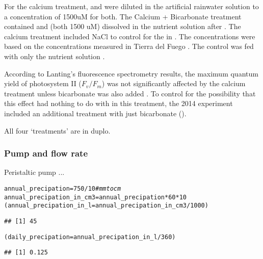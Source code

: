 \documentclass[12pt,a4paper,draft]{article}\usepackage[]{graphicx}\usepackage[]{color}
\makeatletter
\newcommand{\hlnum}[1]{\textcolor[rgb]{0.686,0.059,0.569}{#1}}%
\newcommand{\hlcom}[1]{\textcolor[rgb]{0.678,0.584,0.686}{\textit{#1}}}%
\newcommand{\hlopt}[1]{\textcolor[rgb]{0,0,0}{#1}}%
\newcommand{\hlstd}[1]{\textcolor[rgb]{0.345,0.345,0.345}{#1}}%
\newcommand{\hlkwb}[1]{\textcolor[rgb]{0.69,0.353,0.396}{#1}}%
\newenvironment{kframe}{%
 \def\at@end@of@kframe{}%
 \ifinner\ifhmode%
  \def\at@end@of@kframe{\end{minipage}}%
  \begin{minipage}{\columnwidth}%
 \fi\fi%
 \def\FrameCommand##1{\hskip\@totalleftmargin \hskip-\fboxsep
 \colorbox{shadecolor}{##1}\hskip-\fboxsep
     \hskip-\linewidth \hskip-\@totalleftmargin \hskip\columnwidth}%
 \MakeFramed {\advance\hsize-\width
   \@totalleftmargin\z@ \linewidth\hsize
   \@setminipage}}%
 {\par\unskip\endMakeFramed%
 \at@end@of@kframe}
\newenvironment{knitrout}{}{} %
\makeatother
\begin{document}
For the calcium treatment,  and  were diluted in the artificial rainwater solution \citep[app.~2]{smolders2001, lanting2010} to a concentration of 1500uM for both. The Calcium + Bicarbonate treatment contained  and  (both 1500 uM) dissolved in the nutrient solution after \citet[app.~2]{lamers1999, lanting2010}. The calcium treatment included NaCl to control for the  in . The concentrations were based on the concentrations measured in Tierra del Fuego \citep[fig.~3]{lanting2010}. The control was fed with only the nutrient solution \citep[app.~2]{lanting2010}.

According to Lanting's fluorescence spectrometry results, the maximum quantum yield of photosystem II ($F_v/F_m$) was not significantly affected by the calcium treatment unless bicarbonate was also added \citep[fig.~19]{lanting2010}. To control for the possibility that this effect had nothing to do with  in this treatment, the 2014 experiment included an additional treatment with just bicarbonate ().

All four `treatments' are in duplo.

\subsubsection{Pump and flow rate}

Peristaltic pump ...

\begin{knitrout}
\color{fgcolor}\begin{kframe}
\begin{alltt}
\hlstd{annual_precipation} \hlkwb{=} \hlnum{750} \hlopt{/} \hlnum{10} \hlcom{# mm to cm}
\hlstd{annual_precipation_in_cm3} \hlkwb{=} \hlstd{annual_precipation} \hlopt{*} \hlnum{60} \hlopt{*} \hlnum{10}
\hlstd{(annual_precipation_in_l} \hlkwb{=} \hlstd{annual_precipation_in_cm3} \hlopt{/} \hlnum{1000}\hlstd{)}
\end{alltt}
\begin{verbatim}
## [1] 45
\end{verbatim}
\begin{alltt}
\hlstd{(daily_precipation} \hlkwb{=} \hlstd{annual_precipation_in_l} \hlopt{/} \hlnum{360}\hlstd{)}
\end{alltt}
\begin{verbatim}
## [1] 0.125
\end{verbatim}
\end{kframe}
\end{knitrout}
\end{document}
